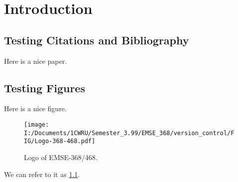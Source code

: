 \chapter{Introduction}

\section{Testing Citations and Bibliography}
\label{sec:testbib}

Here is a nice paper.\cite{ernst-2017-142} 


\section{Testing Figures}
\label{sec:testfig}

Here is a nice figure.

\begin{figure}[t]
  \centering

  \texttt{[image: I:/Documents/1CWRU/Semester\_3.99/EMSE\_368/version\_control/FIG/Logo-368-468.pdf]}
  \caption{Logo of EMSE-368/468.}
  \label{fig:logo}
\end{figure}

We can refer to it as \ref{fig:logo}.


% 				
% 



